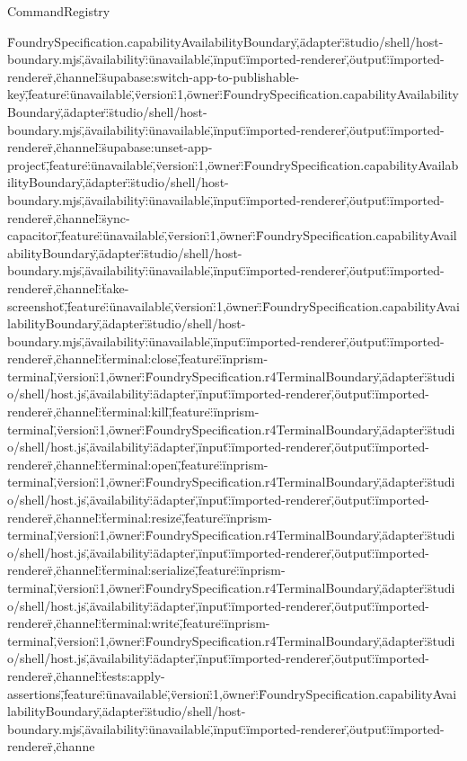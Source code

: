 \begin{lexlean}{CommandRegistry}
\begin{semanticmodule}
{\"FoundrySpecification.capabilityAvailabilityBoundary\",\"adapter\":\"studio/shell/host-boundary.mjs\",\"availability\":\"unavailable\",\"input\":\"imported-renderer\",\"output\":\"imported-renderer\"},{\"channel\":\"supabase:switch-app-to-publishable-key\",\"feature\":\"unavailable\",\"version\":1,\"owner\":\"FoundrySpecification.capabilityAvailabilityBoundary\",\"adapter\":\"studio/shell/host-boundary.mjs\",\"availability\":\"unavailable\",\"input\":\"imported-renderer\",\"output\":\"imported-renderer\"},{\"channel\":\"supabase:unset-app-project\",\"feature\":\"unavailable\",\"version\":1,\"owner\":\"FoundrySpecification.capabilityAvailabilityBoundary\",\"adapter\":\"studio/shell/host-boundary.mjs\",\"availability\":\"unavailable\",\"input\":\"imported-renderer\",\"output\":\"imported-renderer\"},{\"channel\":\"sync-capacitor\",\"feature\":\"unavailable\",\"version\":1,\"owner\":\"FoundrySpecification.capabilityAvailabilityBoundary\",\"adapter\":\"studio/shell/host-boundary.mjs\",\"availability\":\"unavailable\",\"input\":\"imported-renderer\",\"output\":\"imported-renderer\"},{\"channel\":\"take-screenshot\",\"feature\":\"unavailable\",\"version\":1,\"owner\":\"FoundrySpecification.capabilityAvailabilityBoundary\",\"adapter\":\"studio/shell/host-boundary.mjs\",\"availability\":\"unavailable\",\"input\":\"imported-renderer\",\"output\":\"imported-renderer\"},{\"channel\":\"terminal:close\",\"feature\":\"inprism-terminal\",\"version\":1,\"owner\":\"FoundrySpecification.r4TerminalBoundary\",\"adapter\":\"studio/shell/host.js\",\"availability\":\"adapter\",\"input\":\"imported-renderer\",\"output\":\"imported-renderer\"},{\"channel\":\"terminal:kill\",\"feature\":\"inprism-terminal\",\"version\":1,\"owner\":\"FoundrySpecification.r4TerminalBoundary\",\"adapter\":\"studio/shell/host.js\",\"availability\":\"adapter\",\"input\":\"imported-renderer\",\"output\":\"imported-renderer\"},{\"channel\":\"terminal:open\",\"feature\":\"inprism-terminal\",\"version\":1,\"owner\":\"FoundrySpecification.r4TerminalBoundary\",\"adapter\":\"studio/shell/host.js\",\"availability\":\"adapter\",\"input\":\"imported-renderer\",\"output\":\"imported-renderer\"},{\"channel\":\"terminal:resize\",\"feature\":\"inprism-terminal\",\"version\":1,\"owner\":\"FoundrySpecification.r4TerminalBoundary\",\"adapter\":\"studio/shell/host.js\",\"availability\":\"adapter\",\"input\":\"imported-renderer\",\"output\":\"imported-renderer\"},{\"channel\":\"terminal:serialize\",\"feature\":\"inprism-terminal\",\"version\":1,\"owner\":\"FoundrySpecification.r4TerminalBoundary\",\"adapter\":\"studio/shell/host.js\",\"availability\":\"adapter\",\"input\":\"imported-renderer\",\"output\":\"imported-renderer\"},{\"channel\":\"terminal:write\",\"feature\":\"inprism-terminal\",\"version\":1,\"owner\":\"FoundrySpecification.r4TerminalBoundary\",\"adapter\":\"studio/shell/host.js\",\"availability\":\"adapter\",\"input\":\"imported-renderer\",\"output\":\"imported-renderer\"},{\"channel\":\"tests:apply-assertions\",\"feature\":\"unavailable\",\"version\":1,\"owner\":\"FoundrySpecification.capabilityAvailabilityBoundary\",\"adapter\":\"studio/shell/host-boundary.mjs\",\"availability\":\"unavailable\",\"input\":\"imported-renderer\",\"output\":\"imported-renderer\"},{\"channe}
\end{semanticmodule}
\end{lexlean}
